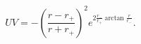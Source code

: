 \begin{equation}
UV= -(\frac{r-r_+}{r+r_+})^2 e^{2\frac{r_-}{r_+}\arctan \frac{r}{r_-}}.
\end{equation}

